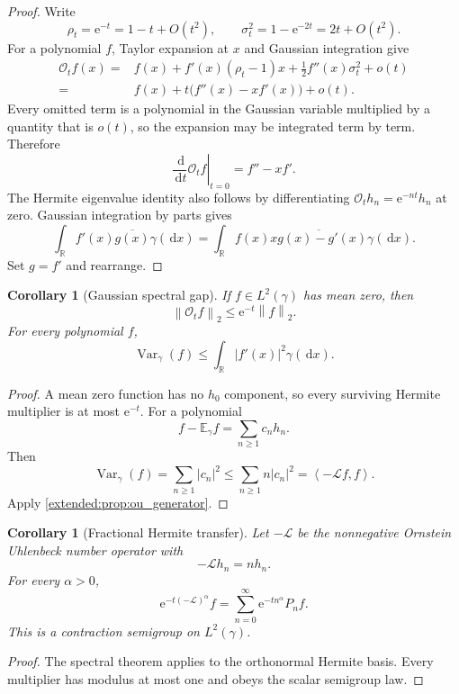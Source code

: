 \documentclass[11pt,a4paper]{article}
\newtheorem{corollary}[theorem]{Corollary}
\theoremstyle{definition}
\theoremstyle{remark}
\newcommand{\Exp}{\mathbb E}
\newcommand{\Var}{\operatorname{Var}}
\newcommand{\norm}[1]{\left\lVert#1\right\rVert}
\newcommand{\RR}{\mathbb R}
\newcommand{\Lcal}{\mathcal L}
\newcommand{\Ocal}{\mathcal O}
\newcommand{\e}{\mathrm e}
\newcommand{\dd}{\,\mathrm d}
\newcommand{\abs}[1]{\left\lvert#1\right\rvert}
\newcommand{\ip}[2]{\left\langle#1,#2\right\rangle}
\begin{document}
\begin{proof}
Write
\[
\rho_t=\e^{-t}=1-t+O(t^2),
\qquad
\sigma_t^2=1-\e^{-2t}=2t+O(t^2).
\]
For a polynomial \(f\), Taylor expansion at \(x\) and Gaussian integration give
\[
\begin{aligned}
\Ocal_tf(x)
={}&f(x)
+f'(x)(\rho_t-1)x
+\frac12f''(x)\sigma_t^2
+o(t)\\
={}&f(x)+t\bigl(f''(x)-xf'(x)\bigr)+o(t).
\end{aligned}
\]
Every omitted term is a polynomial in the Gaussian variable multiplied by a quantity that is \(o(t)\), so the expansion may be integrated term by term. Therefore
\[
\left.\frac{\dd}{\dd t}\Ocal_tf\right|_{t=0}
=f''-xf'.
\]
The Hermite eigenvalue identity also follows by differentiating
\(
\Ocal_th_n=\e^{-nt}h_n
\)
at zero. Gaussian integration by parts gives
\[
\int_\RR f'(x)\overline{g(x)}\gamma(\dd x)
=
\int_\RR f(x)\overline{xg(x)-g'(x)}\gamma(\dd x).
\]
Set \(g=f'\) and rearrange.
\end{proof}

\begin{corollary}[Gaussian spectral gap]\label{extended:record:043}\label{extended:cor:ou_spectral_gap}
If \(f\in L^2(\gamma)\) has mean zero, then
\[
\norm{\Ocal_tf}_2
\leq
\e^{-t}\norm f_2.
\]
For every polynomial \(f\),
\[
\Var_\gamma(f)
\leq
\int_\RR\abs{f'(x)}^2\gamma(\dd x).
\]
\end{corollary}

\begin{proof}
A mean zero function has no \(h_0\) component, so every surviving Hermite multiplier is at most \(\e^{-t}\). For a polynomial
\[
f-\Exp_\gamma f=\sum_{n\geq1}c_nh_n.
\]
Then
\[
\Var_\gamma(f)=\sum_{n\geq1}\abs{c_n}^2
\leq
\sum_{n\geq1}n\abs{c_n}^2
=
\ip{-\Lcal f}{f}.
\]
Apply \cref{extended:prop:ou_generator}.
\end{proof}

\begin{corollary}[Fractional Hermite transfer]\label{extended:record:044}\label{extended:cor:fractional_hermite}
Let \(-\Lcal\) be the nonnegative Ornstein Uhlenbeck number operator with
\[
-\Lcal h_n=nh_n.
\]
For every \(\alpha>0\),
\[
\e^{-t(-\Lcal)^\alpha}f
=
\sum_{n=0}^\infty
\e^{-tn^\alpha}P_nf.
\]
This is a contraction semigroup on \(L^2(\gamma)\).
\end{corollary}

\begin{proof}
The spectral theorem applies to the orthonormal Hermite basis. Every multiplier has modulus at most one and obeys the scalar semigroup law.
\end{proof}
\end{document}
